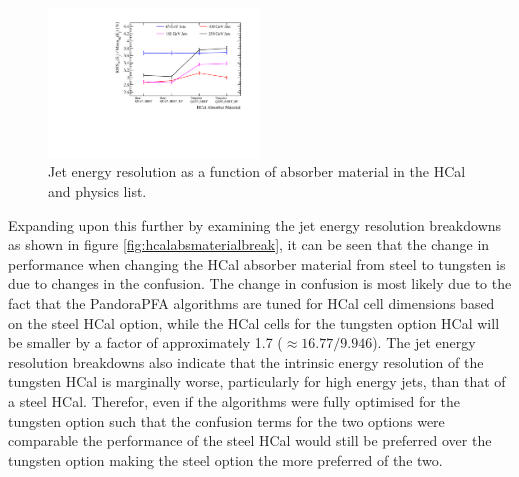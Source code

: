 \begin{figure}
\centering
\includegraphics[width=0.5\textwidth]{OptimisationStudies/Plots/JetEnergyResolutions/JER_vs_HCalAbsorberMaterial.pdf}
\caption[Jet energy resolution as a function of absorber material in the HCal and physics list.]{Jet energy resolution as a function of absorber material in the HCal and physics list.}
\label{fig:hcalabsmaterial}
\end{figure} 

Expanding upon this further by examining the jet energy resolution breakdowns as shown in figure \ref{fig:hcalabsmaterialbreak}, it can be seen that the change in performance when changing the HCal absorber material from steel to tungsten is due to changes in the confusion.  The change in confusion is most likely due to the fact that the PandoraPFA algorithms are tuned for HCal cell dimensions based on the steel HCal option, while the HCal cells for the tungsten option HCal will be smaller by a factor of approximately 1.7 ($\approx 16.77/9.946$).  The jet energy resolution breakdowns also indicate that the intrinsic energy resolution of the tungsten HCal is marginally worse, particularly for high energy jets, than that of a steel HCal.  Therefor, even if the algorithms were fully optimised for the tungsten option such that the confusion terms for the two options were comparable the performance of the steel HCal would still be preferred over the tungsten option making the steel option the more preferred of the two.  

